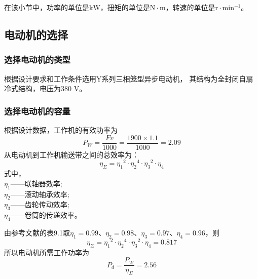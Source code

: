 在该小节中，功率的单位是$\mathrm{kW}$，扭矩的单位是$\mathrm{N\cdot m}$，转速的单位是$\mathrm{r\cdot min^{-1}}$。
\subsection{电动机的选择}
\subsubsection{选择电动机的类型}
根据设计要求和工作条件选用Y系列三相笼型异步电动机，
其结构为全封闭自扇冷式结构，电压为380 V。
\subsubsection{选择电动机的容量}
根据设计数据，工作机的有效功率为
$$P_{W}=\frac{Fv}{1000}=\frac{1900\times{1.1}}{1000}=2.09$$
从电动机到工作机输送带之间的总效率为：
$$\eta_{\Sigma}={{\eta_1}^{2}}\cdot{{\eta_2}^{4}}\cdot{{\eta_3}^{2}}\cdot{\eta_4}$$
式中，\\
$\eta_1$——联轴器效率; \\
$\eta_2$——滚动轴承效率; \\
$\eta_3$——齿轮传动效率; \\
$\eta_4$——卷筒的传递效率。 \\
\par 由参考文献\cite{1}的表9.1取$\eta_1=0.99$、$\eta_2=0.98$、$\eta_3=0.97$、$\eta_4=0.96$，则
$$\eta_{\Sigma}={{\eta_1}^{2}}\cdot{{\eta_2}^{4}}\cdot{{\eta_3}^{2}}\cdot{\eta_4}=0.817$$
所以电动机所需工作功率为
$$P_d=\frac{P_W}{\eta_{\Sigma}}=2.56$$
